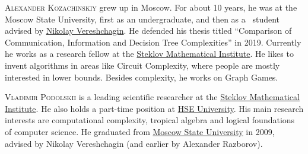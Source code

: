 \documentclass{toc}
\begin{document}
%
%
%
%
%
%
%
%
%
%
%
%
%
%
%
%
%
%
%
%
\begin{tocaboutauthors}
\begin{tocabout}[kozachinskiy]  %
  \textsc{Alexander Kozachinskiy}  grew up in Moscow. For about 10 years, he was at the Moscow State University, first as an undergraduate, and then as a \phd\ student advised by \href{https://www.hse.ru/en/staff/vereshchagin}{Nikolay Vereshchagin}. He defended his thesis 
%
titled ``Comparison   %
of Communication, Information and Decision Tree Complexities'' in 2019.
%
Currently  %
he works as a research fellow at the \href{http://mi-ras.ru/index.php?l=1}{Steklov Mathematical Institute}. He likes to invent algorithms in areas like Circuit Complexity, where people are mostly interested in lower bounds. Besides complexity, he works on Graph Games.

\end{tocabout}
\begin{tocabout}[podolskii]
\textsc{Vladimir Podolskii} is a leading scientific researcher
%
at the   %
\href{http://mi-ras.ru/index.php?l=1}{Steklov Mathematical Institute}. He also %
holds a  %
part-time position %
at  %
\href{https://www.hse.ru/en/}{HSE University}. His main research interests are computational complexity, tropical algebra and logical foundations of computer science. He graduated from \href{https://www.msu.ru/en/}{Moscow State University} in 2009, advised by Nikolay Vereshchagin (and earlier by Alexander Razborov).
\end{tocabout}
\end{tocaboutauthors}
\end{document}

